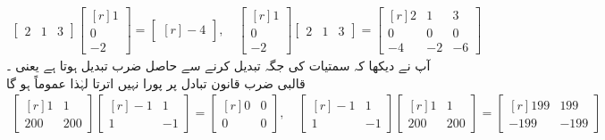\begin{align*}
\begin{bmatrix} 
2 & 1 & 3
\end{bmatrix}
\begin{bmatrix*}[r]
1\\
0\\
-2
\end{bmatrix*}=
\begin{bmatrix*}[r]
-4
\end{bmatrix*}, \quad
\begin{bmatrix*}[r]
1\\
0\\
-2
\end{bmatrix*}
\begin{bmatrix} 
2 & 1 & 3
\end{bmatrix}=
\begin{bmatrix*}[r]
2&1&3\\
0&0&0\\
-4&-2&-6
\end{bmatrix*}
\end{align*}
آپ نے دیکھا کہ سمتیات کی جگہ تبدیل کرنے سے حاصل ضرب تبدیل ہوتا ہے یعنی ۔
\quad قالبی ضرب قانون تبادل پر پورا نہیں اترتا لہٰذا عموماً  ہو گا\\
\begin{align*}
\begin{bmatrix*}[r]
1&1\\
200&200
\end{bmatrix*}
\begin{bmatrix*}[r]
-1&1\\
1&-1
\end{bmatrix*}=
\begin{bmatrix*}[r]
0&0\\
0&0
\end{bmatrix*},\quad 
\begin{bmatrix*}[r]
-1&1\\
1&-1
\end{bmatrix*}
\begin{bmatrix*}[r]
1&1\\
200&200
\end{bmatrix*}
=
\begin{bmatrix*}[r]
199&199\\
-199&-199
\end{bmatrix*}
\end{align*}

